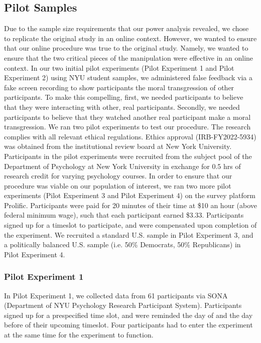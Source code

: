 \documentclass[12pt,]{article}
\begin{document}
\subsection{Pilot Samples}
\label{appendix:pilot_samples}
Due to the sample size requirements that our power analysis revealed, we chose to replicate the original study in an online context. However, we wanted to ensure that our online procedure was true to the original study. Namely, we wanted to ensure that the two critical pieces of the manipulation were effective in an online context. In our two initial pilot experiments (Pilot Experiment 1 and Pilot Experiment 2) using NYU student samples, we administered false feedback via a fake screen recording to show participants the moral transgression of other participants. To make this compelling, first, we needed participants to believe that they were interacting with other, real participants. Secondly, we needed participants to believe that they watched another real participant make a moral transgression.  We ran two pilot experiments to test our procedure. The research complies with all relevant ethical regulations. Ethics approval (IRB-FY2022-5934) was obtained from the institutional review board at New York University. Participants in the pilot experiments were recruited from the subject pool of the Department of Psychology at New York University in exchange for 0.5 hrs of research credit for varying psychology courses. In order to ensure that our procedure was viable on our population of interest, we ran two more pilot experiments (Pilot Experiment 3 and Pilot Experiment 4) on the survey platform Prolific. Participants were paid for 20 minutes of their time at \$10 an hour (above federal minimum wage), such that each participant earned \$3.33. Participants signed up for a timeslot to participate, and were compensated upon completion of the experiment. We recruited a standard U.S. sample in Pilot Experiment 3, and a politically balanced U.S. sample (i.e. 50\% Democrats, 50\% Republicans) in Pilot Experiment 4.


 \subsubsection{Pilot Experiment 1}
\label{appendix:px1}

In Pilot Experiment 1, we collected data from 61 participants via SONA (Department of NYU Psychology Research Participant System). Participants signed up for a prespecified time slot, and were reminded the day of and the day before of their upcoming timeslot. Four participants had to enter the experiment at the same time for the experiment to function.
\end{document}
